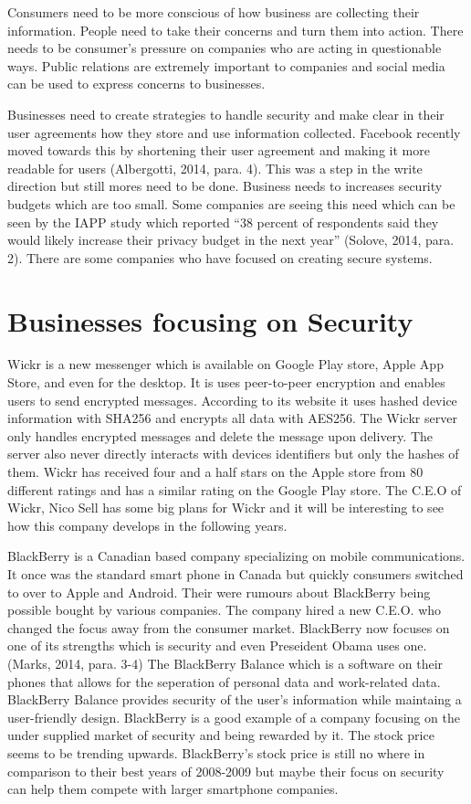 \documentclass[12pt]{article}
\begin{document}
Consumers need to be more conscious of how business are collecting their information. People need to take their concerns and turn them into action. There needs to be consumer's pressure on companies who are acting in questionable ways. Public relations are extremely important to companies and social media can be used to express concerns to businesses. 

Businesses need to create strategies to handle security and make clear in their user agreements how they store and use information collected. Facebook recently moved towards this by shortening their user agreement and making it more readable for users (Albergotti, 2014, para. 4). This was a step in the write direction but still mores need to be done. Business needs to increases security budgets which are too small. Some companies are seeing this need which can be seen  by the IAPP study which reported ``38 percent of respondents said they would likely increase their privacy budget in the next year'' (Solove, 2014, para. 2). There are some companies who have focused on creating secure systems.

\section{Businesses focusing on Security}\label{sec:real-life}
Wickr is a new messenger which is available on Google Play store, Apple App Store, and even for the desktop. It is uses peer-to-peer encryption and enables users to send encrypted messages.  According to its website it uses hashed device information with SHA256 and encrypts all data with AES256. The Wickr server only handles encrypted messages and delete the message upon delivery. The server also never directly interacts with devices identifiers but only the hashes of them. Wickr has received four and a half stars on the Apple store from 80 different ratings and has a similar rating on the Google Play store. The C.E.O of Wickr, Nico Sell has some big plans for Wickr and it will be interesting to see how this company develops in the following years.

BlackBerry is a Canadian based company specializing on mobile communications. It once was the standard smart phone in Canada but quickly consumers switched to over to Apple and Android. Their were rumours about BlackBerry being possible bought by various companies. The company hired a new C.E.O. who changed the focus away from the consumer market. BlackBerry now focuses on one of its strengths which is security and even Preseident Obama uses one.(Marks, 2014, para. 3-4) The BlackBerry Balance which is a software on their phones that allows for the seperation of personal data and work-related data. BlackBerry Balance provides security of the user's information while maintaing a user-friendly design. BlackBerry is a good example of a company focusing on the under supplied market of security and being rewarded by it. The stock price seems to be trending upwards. BlackBerry's stock price is still no where in comparison to their best years of 2008-2009 but maybe their focus on security can help them compete with larger smartphone companies.
\end{document}
